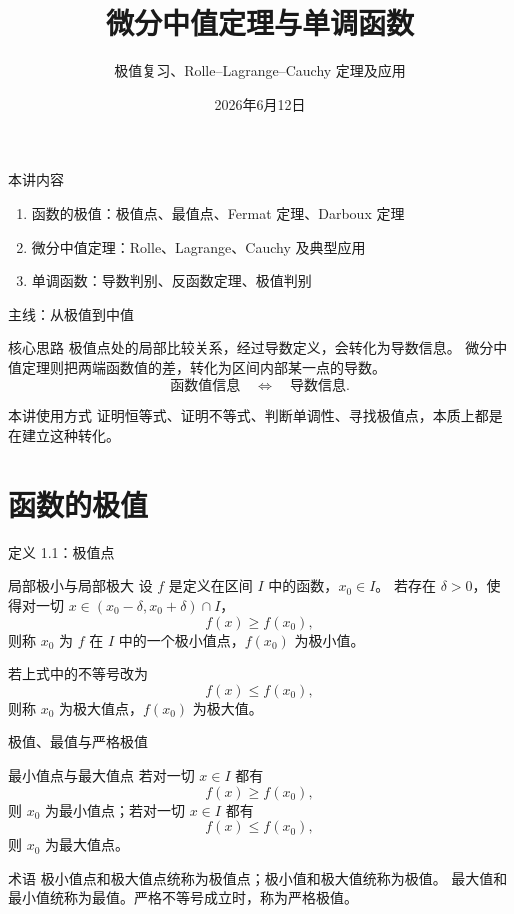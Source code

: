 \documentclass[aspectratio=169,10pt]{ctexbeamer}
\title{微分中值定理与单调函数}
\subtitle{极值复习、Rolle--Lagrange--Cauchy 定理及应用}
\author{}
\date{2026年6月12日}
\begin{document}
\begin{frame}[plain]
  \titlepage
\end{frame}

\begin{frame}{本讲内容}
\begin{enumerate}
  \item 函数的极值：极值点、最值点、Fermat 定理、Darboux 定理
  \item 微分中值定理：Rolle、Lagrange、Cauchy 及典型应用
  \item 单调函数：导数判别、反函数定理、极值判别
\end{enumerate}
\end{frame}

\begin{frame}{主线：从极值到中值}
\small
\begin{block}{核心思路}
极值点处的局部比较关系，经过导数定义，会转化为导数信息。
微分中值定理则把两端函数值的差，转化为区间内部某一点的导数。
\[
  \text{函数值信息}
  \quad\Longleftrightarrow\quad
  \text{导数信息}.
\]
\end{block}
\begin{alertblock}{本讲使用方式}
证明恒等式、证明不等式、判断单调性、寻找极值点，本质上都是在建立这种转化。
\end{alertblock}
\end{frame}

\section{函数的极值}

\begin{frame}{定义 1.1：极值点}
\small
\begin{block}{局部极小与局部极大}
设 $f$ 是定义在区间 $I$ 中的函数，$x_0\in I$。
若存在 $\delta>0$，使得对一切
$x\in(x_0-\delta,x_0+\delta)\cap I$，
\[
  f(x)\ge f(x_0),
\]
则称 $x_0$ 为 $f$ 在 $I$ 中的一个极小值点，$f(x_0)$ 为极小值。

若上式中的不等号改为
\[
  f(x)\le f(x_0),
\]
则称 $x_0$ 为极大值点，$f(x_0)$ 为极大值。
\end{block}
\end{frame}

\begin{frame}{极值、最值与严格极值}
\small
\begin{block}{最小值点与最大值点}
若对一切 $x\in I$ 都有
\[
  f(x)\ge f(x_0),
\]
则 $x_0$ 为最小值点；若对一切 $x\in I$ 都有
\[
  f(x)\le f(x_0),
\]
则 $x_0$ 为最大值点。
\end{block}

\begin{alertblock}{术语}
极小值点和极大值点统称为极值点；极小值和极大值统称为极值。
最大值和最小值统称为最值。严格不等号成立时，称为严格极值。
\end{alertblock}
\end{frame}
\end{document}
